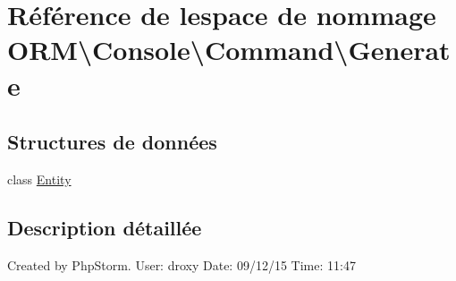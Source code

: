 \hypertarget{namespace_o_r_m_1_1_console_1_1_command_1_1_generate}{}\section{Référence de l\textquotesingle{}espace de nommage O\+RM\textbackslash{}Console\textbackslash{}Command\textbackslash{}Generate}
\label{namespace_o_r_m_1_1_console_1_1_command_1_1_generate}
\subsection*{Structures de données}
\begin{DoxyCompactItemize}
\item 
class \hyperlink{class_o_r_m_1_1_console_1_1_command_1_1_generate_1_1_entity}{Entity}
\end{DoxyCompactItemize}


\subsection{Description détaillée}
Created by Php\+Storm. User\+: droxy Date\+: 09/12/15 Time\+: 11\+:47 